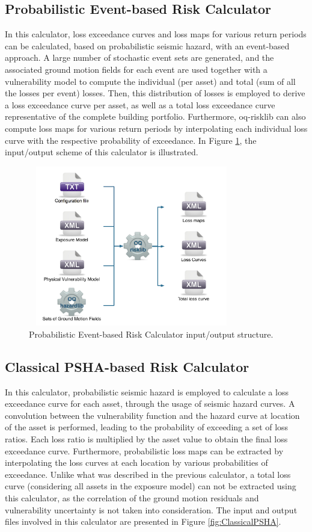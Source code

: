 \subsection{Probabilistic Event-based Risk Calculator}
In this calculator, loss exceedance curves and loss maps for various return periods can be calculated, based on probabilistic seismic hazard, with an event-based approach. A large number of stochastic event sets are generated, and the associated ground motion fields for each event are used together with a vulnerability model to compute the individual (per asset) and total (sum of all the losses per event) losses. Then, this distribution of losses is employed to derive a loss exceedance curve per asset, as well as a total loss exceedance curve representative of the complete building portfolio. Furthermore, oq-risklib can also compute loss maps for various return periods by interpolating each individual loss curve with the respective probability of exceedance. In Figure \ref{fig:ProbEvent}, the input/output scheme of this calculator is illustrated.

\begin{figure}[ht]
\centering
\includegraphics[width=9cm,height=7cm]{./figures/risk/ProbEvent.pdf}
\caption{Probabilistic Event-based Risk Calculator input/output structure.}
\label{fig:ProbEvent}
\end{figure}

\subsection{Classical PSHA-based Risk Calculator}
In this calculator, probabilistic seismic hazard is employed to calculate a loss exceedance curve for each asset, through the usage of seismic hazard curves. A convolution between the vulnerability function and the hazard curve at location of the asset is performed, leading to the probability of exceeding a set of loss ratios. Each loss ratio is multiplied by the asset value to obtain the final loss exceedance curve. Furthermore, probabilistic loss maps can be extracted by interpolating the loss curves at each location by various probabilities of exceedance. Unlike what was described in the previous calculator, a total loss curve (considering all assets in the exposure model) can not be extracted using this calculator, as the correlation of the ground motion residuals and vulnerability uncertainty is not taken into consideration. The input and output files involved in this calculator are presented in Figure \ref{fig:ClassicalPSHA}.

